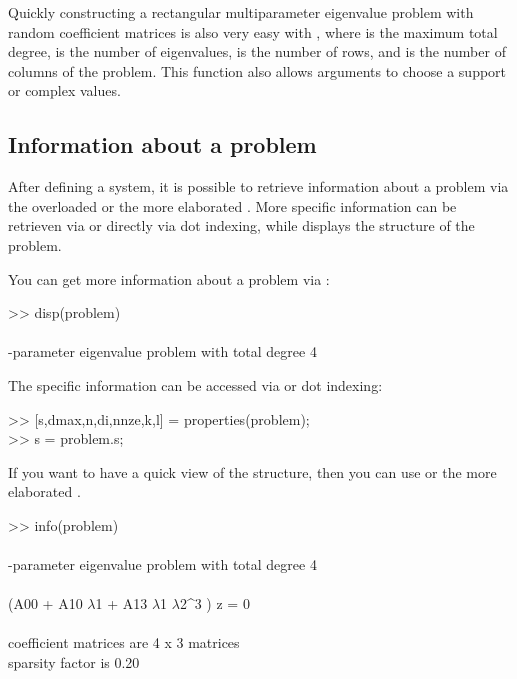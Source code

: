 \documentclass{manual}
\begin{document}
            Quickly constructing a rectangular multiparameter eigenvalue problem with random coefficient matrices is also very easy with , where  is the maximum total degree,  is the number of eigenvalues,  is the number of rows, and  is the number of columns of the problem.
            This function also allows arguments to choose a support or complex values.
        
        \subsection{Information about a problem}

            After defining a system, it is possible to retrieve information about a problem via the overloaded  or the more elaborated . 
            More specific information can be retrieven via  or directly via dot indexing, while  displays the structure of the problem.
            \begin{code}
                You can get more information about a problem via :
                \begin{codeblock}
                    >> disp(problem) \\ \phantom{-} \\
                    -parameter eigenvalue problem with total degree 4 
                \end{codeblock}
                \noindent The specific information can be accessed via  or dot indexing:
                \begin{codeblock}
                    >> {[s,dmax,n,di,nnze,k,l]} = properties(problem); \\
                    >> s = problem.s;
                \end{codeblock}
                \noindent If you want to have a quick view of the structure, then you can use  or the more elaborated .
                \begin{codeblock}
                    >> info(problem) \\ \phantom{-} \\
                    -parameter eigenvalue problem with total degree 4 \\ \phantom{-} \\
                    \tab \tab (A00 + A10 $\lambda$1 + A13 $\lambda$1 $\lambda$2\^{}3 ) z = 0 \\ \phantom{-} \\
                    \tab coefficient matrices are 4 x 3 matrices \\
                    \tab sparsity factor is 0.20 
                \end{codeblock}
            \end{code}
\end{document}
